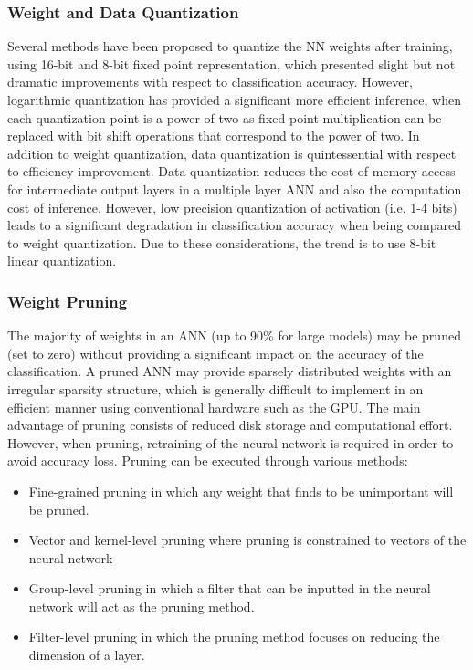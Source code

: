 \subsubsection{Weight and Data Quantization}
Several methods have been proposed to quantize the NN weights after training, using 16-bit\cite{deepLearningLimitedNumericalPrecision} and 8-bit\cite{8BitApprox} fixed point representation, which presented slight but not dramatic improvements with respect to classification accuracy. However, logarithmic quantization\cite{NetworkQuantization} has provided a significant more efficient inference, when each quantization point is a power of two as fixed-point multiplication can be replaced with bit shift operations that correspond to the power of two.
In addition to weight quantization, data quantization is quintessential with respect to efficiency improvement. Data quantization reduces the cost of memory access for intermediate output layers\cite{NetworkQuantization} in a multiple layer ANN and also the computation cost of inference. However, low precision quantization of activation (i.e. 1-4 bits) leads to a significant degradation in classification accuracy when being compared to weight quantization\cite{weightsActivationsConstrained}. Due to these considerations, the trend is to use 8-bit linear quantization.

\subsubsection{Weight Pruning}
The majority of weights in an ANN (up to 90\% for large models) may be pruned (set to zero) without providing a significant impact on the accuracy of the classification. A pruned ANN may provide sparsely distributed weights with an irregular sparsity structure, which is generally difficult to implement in an efficient manner using conventional hardware such as the GPU\cite{deepCompression}. The main advantage of pruning consists of reduced disk storage and computational effort. However, when pruning, retraining of the neural network is required in order to avoid accuracy loss\cite{learningOnHardware}.
Pruning can be executed through various methods:
\begin{itemize}
    \item Fine-grained pruning in which any weight that finds to be unimportant will be pruned.
    \item Vector and kernel-level pruning where pruning is constrained to vectors of the neural network
    \item Group-level pruning in which a filter that can be inputted in the neural network will act as the pruning method.
    \item Filter-level pruning in which the pruning method focuses on reducing the dimension of a layer.
\end{itemize}

